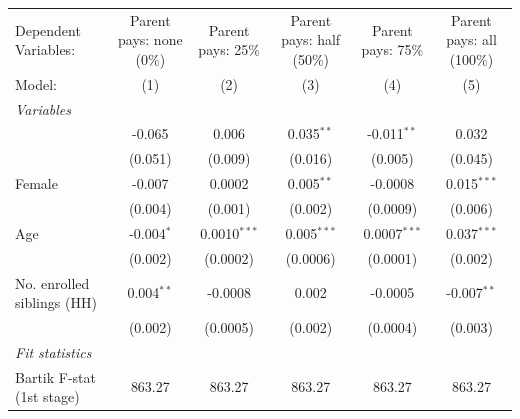 \begin{tabular}{lccccc}
   \tabularnewline \midrule \midrule
   Dependent Variables:                                                  & Parent pays: none (0\%)  & Parent pays: 25\%  & Parent pays: half (50\%)  & Parent pays: 75\%  & Parent pays: all (100\%)\\   
   Model:                                                                & (1)                      & (2)                & (3)                       & (4)                & (5)\\  
   \midrule
   \emph{Variables}\\
        & -0.065                   & 0.006              & 0.035$^{**}$              & -0.011$^{**}$      & 0.032\\   
                                                                         & (0.051)                  & (0.009)            & (0.016)                   & (0.005)            & (0.045)\\   
   Female                                                                & -0.007                   & 0.0002             & 0.005$^{**}$              & -0.0008            & 0.015$^{***}$\\   
                                                                         & (0.004)                  & (0.001)            & (0.002)                   & (0.0009)           & (0.006)\\   
   Age                                                                   & -0.004$^{*}$             & 0.0010$^{***}$     & 0.005$^{***}$             & 0.0007$^{***}$     & 0.037$^{***}$\\   
                                                                         & (0.002)                  & (0.0002)           & (0.0006)                  & (0.0001)           & (0.002)\\   
   No. enrolled siblings (HH)                                            & 0.004$^{**}$             & -0.0008            & 0.002                     & -0.0005            & -0.007$^{**}$\\   
                                                                         & (0.002)                  & (0.0005)           & (0.002)                   & (0.0004)           & (0.003)\\   
   \midrule
   \emph{Fit statistics}\\
   Bartik F-stat (1st stage)                                     & 863.27                   & 863.27             & 863.27                    & 863.27             & 863.27\\  

\end{tabular}
